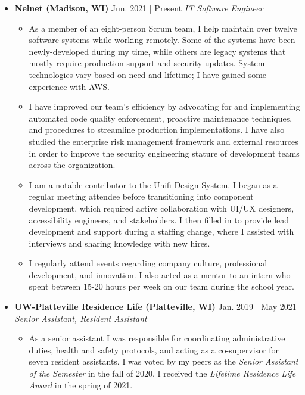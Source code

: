 \documentclass[11pt]{article}
\newcommand{\job}[3]{\vspace{1.5mm}
  \textbf{#1} \hfill #2 \linebreak \textit{#3}
}
\begin{document}
\begin{itemize}[leftmargin=*]
	\item[]
	      \job
	      {Nelnet (Madison, WI)}
	      {Jun. 2021 | Present}
	      {IT Software Engineer}
	      \begin{itemize}
	      	\item As a member of an eight-person Scrum team, I help maintain over twelve software systems while working remotely. Some of the systems have been newly-developed during my time, while others are legacy systems that mostly require production support and security updates. System technologies vary based on need and lifetime; I have gained some experience with AWS.
                     \item I have improved our team's efficiency by advocating for and implementing automated code quality enforcement, proactive maintenance techniques, and procedures to streamline production implementations. I have also studied the enterprise risk management framework and external resources in order to improve the security engineering stature of development teams across the organization.
                     \item I am a notable contributor to the \href{https://unifi.nelnet.io/}{Unifi Design System}. I began as a regular meeting attendee before transitioning into component development, which required active collaboration with UI/UX designers, accessibility engineers, and stakeholders. I then filled in to provide lead development and support during a staffing change, where I assisted with interviews and sharing knowledge with new hires.
                     \item I regularly attend events regarding company culture, professional development, and innovation. I also acted as a mentor to an intern who spent between 15-20 hours per week on our team during the school year.
	      \end{itemize}
	\item[]
	      \job
	      {UW-Platteville Residence Life (Platteville, WI)}
	      {Jan. 2019 | May 2021}
	      {Senior Assistant, Resident Assistant}
	      \begin{itemize}
	      	\item As a senior assistant I was responsible for coordinating administrative duties, health and safety protocols, and acting as a co-supervisor for seven resident assistants. I was voted by my peers as the \emph{Senior Assistant of the Semester} in the fall of 2020. I received the \emph{Lifetime Residence Life Award} in the spring of 2021.

\end{itemize}
\end{itemize}
\end{document}
